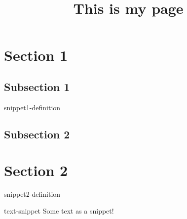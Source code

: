 \documentclass[preview]{standalone}
\begin{document}
\title{This is my page}

\genpage
\gencourse

\section{Section 1}

\subsection{Subsection 1}

\begin{snippet}{snippet1-definition}
\end{snippet}

\subsection{Subsection 2}

\section{Section 2}

\begin{snippet}{snippet2-definition}
\end{snippet}


\begin{snippet}{text-snippet}
Some text as a snippet!
\end{snippet}
\end{document}
